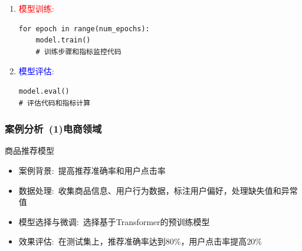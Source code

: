 \begin{frame}
\begin{enumerate}
\begin{lstlisting}[style=pythonstyle]
            \end{lstlisting}
    \item \textcolor{red}{模型训练:}\\
	    {\fontsize{7.2pt}{6.2pt}\selectfont{在训练集上微调模型，监控性能指标，如准确率、损失值}}
            \begin{lstlisting}[style=pythonstyle]
for epoch in range(num_epochs):
    model.train()
    # 训练步骤和指标监控代码
            \end{lstlisting}
            \begin{center}
            \end{center}
    \item \textcolor{blue}{模型评估:}\\
	    {\fontsize{7.2pt}{6.2pt}\selectfont{在验证集和测试集上评估微调后模型性能，分析评估结果}}
            \begin{lstlisting}[style=pythonstyle]
model.eval()
# 评估代码和指标计算
            \end{lstlisting}
    \end{enumerate}
    \begin{center}
    \end{center}
\end{frame}

\begin{frame}[allowframebreaks]
	\frametitle{案例分析~\textrm{(1)}电商领域}
商品推荐模型
            \begin{itemize}
		\setlength{\itemsep}{10pt}
                \item 案例背景:~提高推荐准确率和用户点击率
                \item 数据处理:~收集商品信息、用户行为数据，标注用户偏好，处理缺失值和异常值\\
			{\fontsize{8.2pt}{6.2pt}\selectfont{数据具有高维度、稀疏性特点}}
		\item 模型选择与微调:~选择基于\textrm{Transformer}的预训练模型\\
			{\fontsize{8.2pt}{6.2pt}}
		\item 效果评估:~在测试集上，推荐准确率达到\textrm{80\%}，用户点击率提高\textrm{20\%}\\
			{\fontsize{8.2pt}{6.2pt}\selectfont{对新用户和新商品推荐效果有待提升}}
            \end{itemize}
\end{frame}

